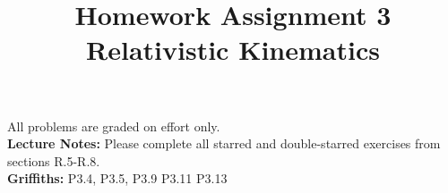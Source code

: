 \documentclass[12pt]{article}
\begin{document}
\date{\vspace{-5ex}}

\title{Homework Assignment 3 \\ Relativistic Kinematics}

\maketitle

\noindent
All problems are graded on effort only.\\

\noindent
{\bf Lecture Notes:}  Please complete all starred and double-starred exercises from sections R.5-R.8.\\

\noindent
{\bf Griffiths:} P3.4, P3.5, P3.9 P3.11 P3.13\\[3pt]
\end{document}
